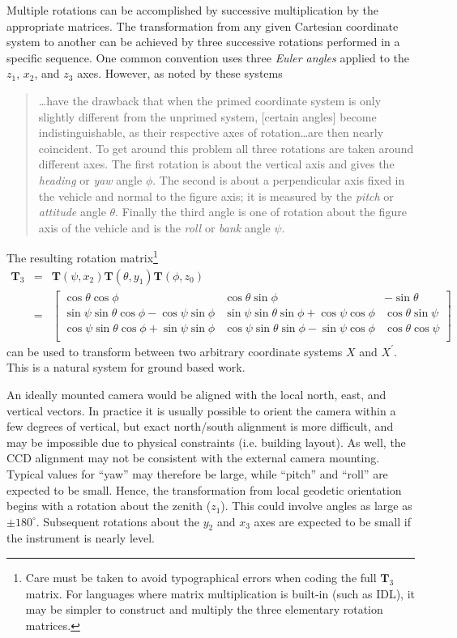 \documentclass[11pt,twoside]{article}   %
\begin{document}
Multiple rotations can be accomplished by successive
multiplication by the appropriate matrices. The transformation
from any given Cartesian coordinate system to another can be
achieved by three successive rotations performed in a specific
sequence. One common convention uses three \emph{Euler angles}
applied to the $z_1$, $x_2$, and $z_3$ axes.  However, as noted by
\cite[pp 147-148]{goldstein_1980} these systems
\begin{quote}
 \ldots have the drawback that when the primed coordinate system
 is only slightly different from the unprimed system, [certain
 angles] become indistinguishable, as their respective axes of
 rotation{\ldots}are then nearly coincident.  To get around this
 problem all three rotations are taken around different axes.  The
 first rotation is about the vertical axis and gives the {\it
 heading} or {\it yaw} angle $\phi$.  The second is about a perpendicular
 axis fixed in the vehicle and normal to the figure axis; it is
 measured by the {\it pitch} or {\it attitude} angle $\theta$.  Finally
 the third angle is one of rotation about the figure axis of the
 vehicle and is the {\it roll} or {\it bank} angle $\psi$.
\end{quote}
%
The resulting rotation matrix\footnote{Care must be taken to avoid
typographical errors when coding the full $\mathbf{T}_3$ matrix.
For languages where matrix multiplication is built-in (such as
{\sf IDL}), it may be simpler to construct and multiply the three
elementary rotation matrices.} %
%
 \begin{eqnarray}
%
 \mathbf{T}_3 &=& \mathbf{T}(\psi,x_2) \mathbf{T}(\theta,y_1)
 \mathbf{T}(\phi,z_0) \\
  &=& \left[
 \begin{array}{ccc}
  \cos\theta\cos\phi &
  \cos\theta\sin\phi &
  -\sin\theta \\
  \sin\psi\sin\theta\cos\phi - \cos\psi\sin\phi &
  \sin\psi\sin\theta\sin\phi + \cos\psi\cos\phi &
  \cos\theta\sin\psi \\
  \cos\psi\sin\theta\cos\phi + \sin\psi\sin\phi &
  \cos\psi\sin\theta\sin\phi - \sin\psi\cos\phi &
  \cos\theta\cos\psi \\
 \end{array}
 \right] \nonumber
%
 \end{eqnarray} \normalsize
can be used to transform between two arbitrary coordinate systems
$X$ and $X^\prime$. This is a natural system for ground based
work.

An ideally mounted camera would be aligned with the local north,
east, and vertical vectors.  In practice it is usually possible to
orient the camera within a few degrees of vertical, but exact
north/south alignment is more difficult, and may be impossible due
to physical constraints (i.e. building layout).  As well, the CCD
alignment may not be consistent with the external camera mounting.
Typical values for ``yaw'' may therefore be large, while ``pitch''
and ``roll'' are expected to be small. Hence, the transformation
from local geodetic orientation begins with a rotation about the
zenith ($z_1$).  This could involve angles as large as $\pm
180^\circ$. Subsequent rotations about the $y_2$ and $x_3$ axes
are expected to be small if the instrument is nearly level.
\end{document}
